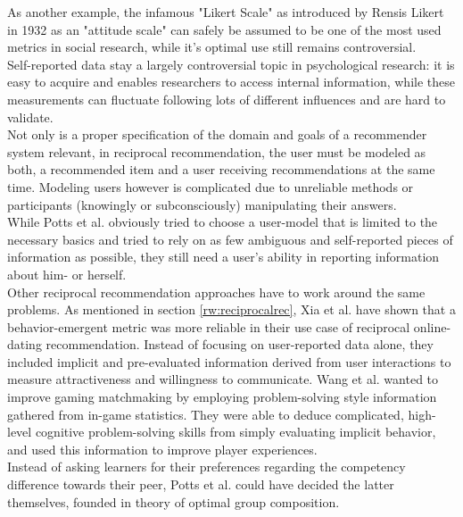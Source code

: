 \documentclass[conference]{IEEEtran}
\begin{document}
As another example, the infamous "Likert Scale" as introduced by Rensis Likert in 1932 as an "attitude scale" \cite{likert1932technique} can safely be assumed to be one of the most used metrics in social research, while it's optimal use still remains controversial. \cite{chang1994psychometric, lee2002cultural}\\
Self-reported data stay a largely controversial topic in psychological research: it is easy to acquire and enables researchers to access internal information, while these measurements can fluctuate following lots of different influences and are hard to validate. \cite{gonyea2005self, lee2002cultural, sorensen2008measuring}\\
Not only is a proper specification of the domain and goals of a recommender system relevant, in reciprocal recommendation, the user must be modeled as both, a recommended item and a user receiving recommendations at the same time. Modeling users however is complicated due to unreliable methods or participants (knowingly or subconsciously) manipulating their answers.\\
While Potts et al. obviously tried to choose a user-model that is limited to the necessary basics and tried to rely on as few ambiguous and self-reported pieces of information as possible, they still need a user's ability in reporting information about him- or herself.\\
Other reciprocal recommendation approaches have to work around the same problems. As mentioned in section \ref{rw:reciprocalrec}, Xia et al. have shown that a behavior-emergent metric was more reliable in their use case of reciprocal online-dating recommendation. \cite{xia2014characterization} Instead of focusing on user-reported data alone, they included implicit and pre-evaluated information derived from user interactions to measure attractiveness and willingness to communicate. \cite{xia2015reciprocal} Wang et al. wanted to improve gaming matchmaking by employing problem-solving style information gathered from in-game statistics. They were able to deduce complicated, high-level cognitive problem-solving skills from simply evaluating implicit behavior, and used this information to improve player experiences. \cite{wang2015thinking}\\
Instead of asking learners for their preferences regarding the competency difference towards their peer, Potts et al. could have decided the latter themselves, founded in theory of optimal group composition. \cite{manske2015using}\\
\end{document}
